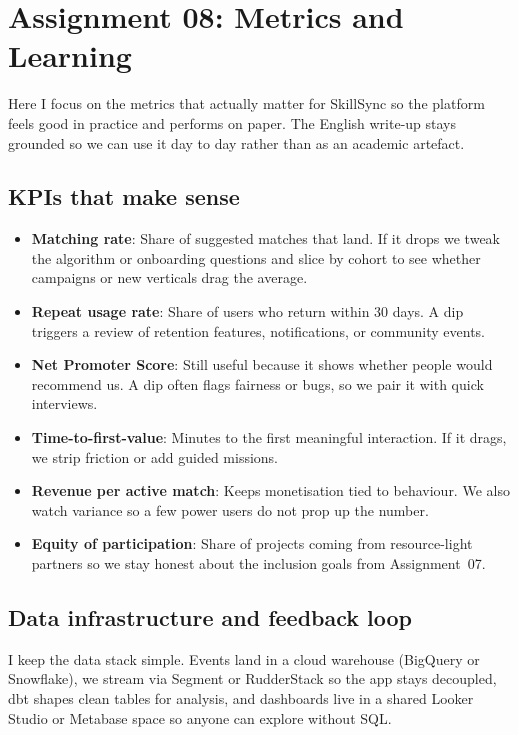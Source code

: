 \section*{Assignment 08: Metrics and Learning}

Here I focus on the metrics that actually matter for SkillSync so the platform feels good in practice and performs on paper. The English write-up stays grounded so we can use it day to day rather than as an academic artefact.

\subsection*{KPIs that make sense}
\begin{itemize}
    \item \textbf{Matching rate}: Share of suggested matches that land. If it drops we tweak the algorithm or onboarding questions and slice by cohort to see whether campaigns or new verticals drag the average.
    \item \textbf{Repeat usage rate}: Share of users who return within 30 days. A dip triggers a review of retention features, notifications, or community events.
    \item \textbf{Net Promoter Score}: Still useful because it shows whether people would recommend us. A dip often flags fairness or bugs, so we pair it with quick interviews.
    \item \textbf{Time-to-first-value}: Minutes to the first meaningful interaction. If it drags, we strip friction or add guided missions.
    \item \textbf{Revenue per active match}: Keeps monetisation tied to behaviour. We also watch variance so a few power users do not prop up the number.
    \item \textbf{Equity of participation}: Share of projects coming from resource-light partners so we stay honest about the inclusion goals from Assignment~07.
\end{itemize}

\subsection*{Data infrastructure and feedback loop}
I keep the data stack simple. Events land in a cloud warehouse (BigQuery or Snowflake), we stream via Segment or RudderStack so the app stays decoupled, dbt shapes clean tables for analysis, and dashboards live in a shared Looker Studio or Metabase space so anyone can explore without SQL.

